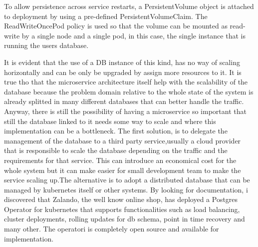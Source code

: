 \documentclass[sigplan,screen]{acmart}
\begin{document}
To allow persistence across service restarts, a PersistentVolume object is attached to deployment by using a pre-defined PersistentVolumeClaim. The ReadWriteOncePod policy is used so that the volume can be mounted as read-write by a single node and a single pod, in this case, the single instance that is running the users database.

It is evident that the use of a DB instance of this kind, has no way of scaling horizontally and can be only be upgraded by assign more resources to it. It is true tho that the microservice architecture itself help with the scalability of the database because the problem domain relative to the whole state of the system is already splitted in many different databases that can better handle the traffic. Anyway, there is still the possibility of having a microservice so important that still the database linked to it needs some way to scale and where this implementation can be a bottleneck. The first solution, is to delegate the management of the database to a third party service,usually a cloud provider that is responsible to scale the database depending on the traffic and the requirements for that service. This can introduce an economical cost for the whole system but it can make easier for small development team to make the service scaling up.The alternative is to adopt a distributed database that can be managed by kubernetes itself or other systems. By looking for documentation, i discovered that Zalando, the well know online shop, has deployed a Postgres Operator for kubernetes that supports functionalities such as load balancing, cluster deployments, rolling updates for db schema, point in time recovery and many other. The operatori is completely open source and available for implementation.
\end{document}
